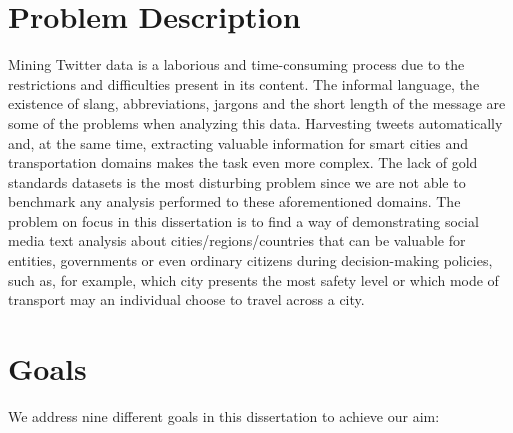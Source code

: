 \documentclass[9pt,a4paper]{extarticle}
\begin{document}
\begin{multicols}{2}
\section{Problem Description}
Mining Twitter data is a laborious and time-consuming process due to the restrictions and difficulties present in its content. The informal language, the existence of slang, abbreviations, jargons and the short length of the message are some of the problems when analyzing this data. Harvesting tweets automatically and, at the same time, extracting valuable information for smart cities and transportation domains makes the task even more complex. The lack of gold standards datasets is the most disturbing problem since we are not able to benchmark any analysis performed to these aforementioned domains. The problem on focus in this dissertation is to find a way of demonstrating social media text analysis about cities/regions/countries that can be valuable for entities, governments or even ordinary citizens during decision-making policies, such as, for example, which city presents the most safety level or which mode of transport may an individual choose to travel across a city.

\section{Goals}\label{sec:goals}


We address nine different goals in this dissertation to achieve our aim:


\end{multicols}
\end{document}
